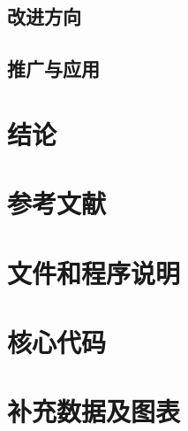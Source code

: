 \documentclass[withoutpreface,bwprint]{cumcmthesis}
\begin{document}
\subsection{改进方向}
\vspace{0.06\textheight}

\subsection{推广与应用}
\vspace{0.06\textheight}

\section{结论}
\vspace{0.10\textheight}

\section*{参考文献}
\vspace{0.08\textheight}

\clearpage
\begin{appendices}
\section{文件和程序说明}
\vspace{0.10\textheight}

\section{核心代码}
\vspace{0.10\textheight}

\section{补充数据及图表}
\vspace{0.10\textheight}
\end{appendices}

\end{document}
